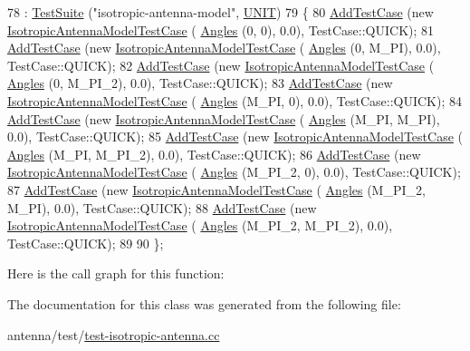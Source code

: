 \begin{DoxyCode}
78   : \hyperlink{classns3_1_1TestSuite_a904b0c40583b744d30908aeb94636d1a}{TestSuite} (\textcolor{stringliteral}{"isotropic-antenna-model"}, \hyperlink{classns3_1_1TestSuite_a1ebfcab34ec8161e085e8e3a1855eae0a3885375a3787abf60431f8454b3cadbd}{UNIT})
79 \{
80   \hyperlink{classns3_1_1TestCase_a3718088e3eefd5d6454569d2e0ddd835}{AddTestCase} (\textcolor{keyword}{new} \hyperlink{classIsotropicAntennaModelTestCase}{IsotropicAntennaModelTestCase} (
      \hyperlink{structns3_1_1Angles}{Angles} (0, 0),           0.0), TestCase::QUICK);
81   \hyperlink{classns3_1_1TestCase_a3718088e3eefd5d6454569d2e0ddd835}{AddTestCase} (\textcolor{keyword}{new} \hyperlink{classIsotropicAntennaModelTestCase}{IsotropicAntennaModelTestCase} (
      \hyperlink{structns3_1_1Angles}{Angles} (0, M\_PI),        0.0), TestCase::QUICK);
82   \hyperlink{classns3_1_1TestCase_a3718088e3eefd5d6454569d2e0ddd835}{AddTestCase} (\textcolor{keyword}{new} \hyperlink{classIsotropicAntennaModelTestCase}{IsotropicAntennaModelTestCase} (
      \hyperlink{structns3_1_1Angles}{Angles} (0, M\_PI\_2),      0.0), TestCase::QUICK);
83   \hyperlink{classns3_1_1TestCase_a3718088e3eefd5d6454569d2e0ddd835}{AddTestCase} (\textcolor{keyword}{new} \hyperlink{classIsotropicAntennaModelTestCase}{IsotropicAntennaModelTestCase} (
      \hyperlink{structns3_1_1Angles}{Angles} (M\_PI, 0),        0.0), TestCase::QUICK);
84   \hyperlink{classns3_1_1TestCase_a3718088e3eefd5d6454569d2e0ddd835}{AddTestCase} (\textcolor{keyword}{new} \hyperlink{classIsotropicAntennaModelTestCase}{IsotropicAntennaModelTestCase} (
      \hyperlink{structns3_1_1Angles}{Angles} (M\_PI, M\_PI),     0.0), TestCase::QUICK);
85   \hyperlink{classns3_1_1TestCase_a3718088e3eefd5d6454569d2e0ddd835}{AddTestCase} (\textcolor{keyword}{new} \hyperlink{classIsotropicAntennaModelTestCase}{IsotropicAntennaModelTestCase} (
      \hyperlink{structns3_1_1Angles}{Angles} (M\_PI, M\_PI\_2),   0.0), TestCase::QUICK);
86   \hyperlink{classns3_1_1TestCase_a3718088e3eefd5d6454569d2e0ddd835}{AddTestCase} (\textcolor{keyword}{new} \hyperlink{classIsotropicAntennaModelTestCase}{IsotropicAntennaModelTestCase} (
      \hyperlink{structns3_1_1Angles}{Angles} (M\_PI\_2, 0),      0.0), TestCase::QUICK);
87   \hyperlink{classns3_1_1TestCase_a3718088e3eefd5d6454569d2e0ddd835}{AddTestCase} (\textcolor{keyword}{new} \hyperlink{classIsotropicAntennaModelTestCase}{IsotropicAntennaModelTestCase} (
      \hyperlink{structns3_1_1Angles}{Angles} (M\_PI\_2, M\_PI),   0.0), TestCase::QUICK);
88   \hyperlink{classns3_1_1TestCase_a3718088e3eefd5d6454569d2e0ddd835}{AddTestCase} (\textcolor{keyword}{new} \hyperlink{classIsotropicAntennaModelTestCase}{IsotropicAntennaModelTestCase} (
      \hyperlink{structns3_1_1Angles}{Angles} (M\_PI\_2, M\_PI\_2), 0.0), TestCase::QUICK);
89 
90 \};
\end{DoxyCode}


Here is the call graph for this function\+:




The documentation for this class was generated from the following file\+:\begin{DoxyCompactItemize}
\item 
antenna/test/\hyperlink{test-isotropic-antenna_8cc}{test-\/isotropic-\/antenna.\+cc}\end{DoxyCompactItemize}

